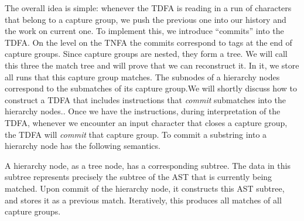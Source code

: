 \documentclass[english]{sigplanconf}
\theoremstyle{definition}
\begin{document}
The overall idea is simple: whenever the TDFA is reading in a run
of characters that belong to a capture group, we push the previous
one into our history and the work on current one. To implement this,
we introduce ``commits'' into the TDFA. On the level on the TNFA
the commits correspond to tags at the end of capture groups. Since
capture groups are nested, they form a tree. We will call this three
the match tree and will prove that we can reconstruct it. In it, we
store all runs that this capture group matches. The subnodes of a
hierarchy nodes correspond to the submatches of its capture group.We
will shortly discuss how to construct a TDFA that includes instructions
that \emph{commit} submatches into the hierarchy nodes.. Once we have
the instructions, during interpretation of the TDFA, whenever we encounter
an input character that closes a capture group, the TDFA will \emph{commit}
that capture group. To commit a substring into a hierarchy node has
the following semantics.

A hierarchy node, as a tree node, has a corresponding subtree. The
data in this subtree represents precisely the subtree of the AST that
is currently being matched. Upon commit of the hierarchy node, it
constructs this AST subtree, and stores it as a previous match. Iteratively,
this produces all matches of all capture groups.

\end{document}
